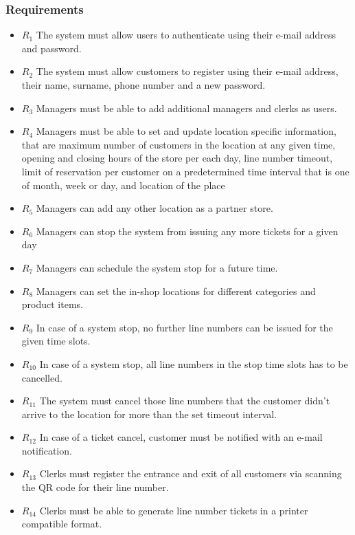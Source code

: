 \subsubsection{Requirements}
\begin{itemize}
    \item \textbf{$R_1$} The system must allow users to authenticate using their e-mail address and password.
    \item \textbf{$R_2$} The system must allow customers to register using their e-mail address, their name, surname, phone number and a new password.
    \item \textbf{$R_3$} Managers must be able to add additional managers and clerks as users. %
    \item \textbf{$R_4$} Managers must be able to set and update location specific information, that are maximum number of customers in the location at any given time, opening and closing hours of the store per each day, line number timeout, limit of reservation per customer on a predetermined time interval that is one of month, week or day, and location of the place
    \item \textbf{$R_5$} Managers can add any other location as a partner store.
    \item \textbf{$R_6$} Managers can stop the system from issuing any more tickets for a given day
    \item \textbf{$R_7$} Managers can schedule the system stop for a future time.
    \item \textbf{$R_8$} Managers can set the in-shop locations for different categories and product items.
    \item \textbf{$R_9$} In case of a system stop, no further line numbers can be issued for the given time slots.
    \item \textbf{$R_{10}$} In case of a system stop, all line numbers in the stop time slots has to be cancelled.
    \item \textbf{$R_{11}$} The system must cancel those line numbers that the customer didn't arrive to the location for more than the set timeout interval.
    \item \textbf{$R_{12}$} In case of a ticket cancel, customer must be notified with an e-mail notification.
    \item \textbf{$R_{13}$} Clerks must register the entrance and exit of all customers via scanning the QR code for their line number.
    \item \textbf{$R_{14}$} Clerks must be able to generate line number tickets in a printer compatible format.

\end{itemize}

